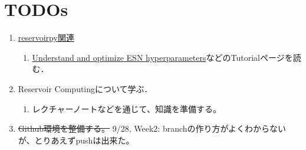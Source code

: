 \section{TODOs}
\begin{enumerate}
  \item \href{https://github.com/reservoirpy/reservoirpy}{reservoirpy関連}
  \begin{enumerate}
  \item \href{https://github.com/reservoirpy/reservoirpy/blob/master/tutorials/4-Understand_and_optimize_hyperparameters.ipynb}{Understand and optimize ESN hyperparameters}などのTutorialページを読む．
  \end{enumerate}
  \item Reservoir Computingについて学ぶ．\begin{enumerate}
    \item レクチャーノートなどを通じて、知識を準備する。
  \end{enumerate}
  \item \sout{Github環境を整備する。} 9/28, Week2: branchの作り方がよくわからないが、とりあえずpushは出来た。
\end{enumerate}
